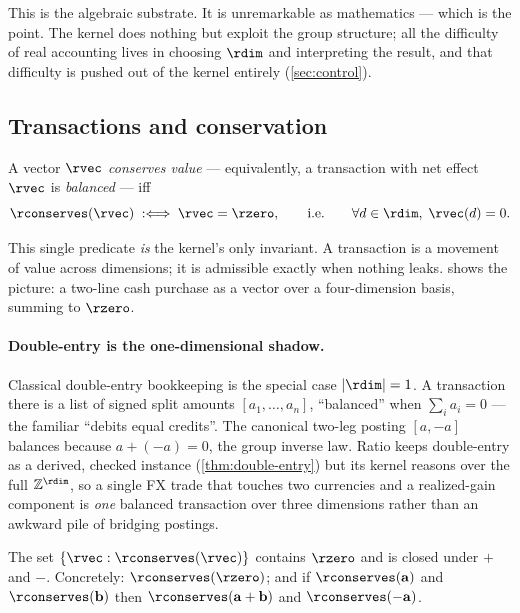This is the algebraic substrate. It is unremarkable as mathematics ---
which is the point. The kernel does nothing but exploit the group
structure; all the difficulty of real accounting lives in choosing
$\rdim$ and interpreting the result, and that difficulty is pushed out of
the kernel entirely (\cref{sec:control}).

\subsection{Transactions and conservation}

\begin{definition}
\label{def:conserves}
A vector $\rvec$ \emph{conserves value} --- equivalently, a transaction
with net effect $\rvec$ is \emph{balanced} --- iff
\[
  \rconserves(\rvec) \;:\Longleftrightarrow\; \rvec = \rzero,
  \qquad\text{i.e.}\qquad \forall d \in \rdim,\; \rvec(d) = 0 .
\]
\end{definition}

This single predicate \emph{is} the kernel's only invariant. A
transaction is a movement of value across dimensions; it is admissible
exactly when nothing leaks.  shows the picture: a
two-line cash purchase as a vector over a four-dimension basis, summing
to $\rzero$.



\paragraph{Double-entry is the one-dimensional shadow.} Classical
double-entry bookkeeping is the special case $|\rdim| = 1$. A transaction
there is a list of signed split amounts $[a_1, \dots, a_n]$, ``balanced''
when $\sum_i a_i = 0$ --- the familiar ``debits equal credits''. The
canonical two-leg posting $[a, -a]$ balances because $a + (-a) = 0$, the
group inverse law. Ratio keeps double-entry as a derived, checked
instance (\cref{thm:double-entry}) but its kernel reasons over the full
$\mathbb{Z}^{\rdim}$, so a single FX trade that touches two currencies and
a realized-gain component is \emph{one} balanced transaction over three
dimensions rather than an awkward pile of bridging postings.

\begin{proposition}
\label{prop:subgroup}
The set $\{\rvec : \rconserves(\rvec)\}$ contains $\rzero$ and is closed
under $+$ and $-$. Concretely:
$\rconserves(\rzero)$; and if $\rconserves(\mathbf{a})$ and
$\rconserves(\mathbf{b})$ then $\rconserves(\mathbf{a}+\mathbf{b})$ and
$\rconserves(-\mathbf{a})$.
\end{proposition}


